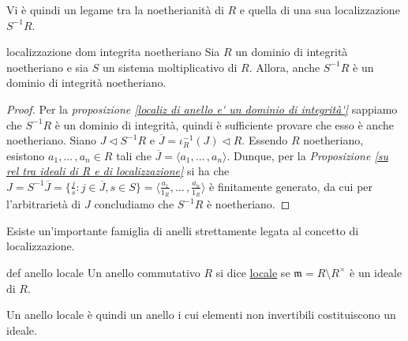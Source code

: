 \noindent Vi è quindi un legame tra la noetherianità di $R$ e quella di una sua localizzazione $S^{-1}R$.

\begin{cor}[1.7.7]{localizzazione dom integrita noetheriano}
  Sia $R$ un dominio di integrità noetheriano e sia $S$ un sistema moltiplicativo di $R$. Allora, anche $S^{-1}R$ è un dominio di integrità noetheriano.
\end{cor}
\vspace{-4mm}
\begin{proof}
  Per la \emph{proposizione \ref{localiz di anello e' un dominio di integrità'}} sappiamo che $S^{-1}R$ è un dominio di integrità, 
  quindi è sufficiente provare che esso è anche noetheriano. Siano $J\lhd S^{-1}R$ e $\overline{J}=\iota_R^{-1}(J)\lhd R$. 
  Essendo $R$ noetheriano, esistono $a_1,...\,,a_n\in R$ tali che $\overline{J}=\langle a_1,...\,,a_n \rangle$. 
  Dunque, per la \emph{Proposizione \ref{su rel tra ideali di R e di localizzazione}} si ha che 
  $J=S^{-1}\overline{J}=\{\frac{j}{s}: j\in\overline{J}, s\in S\}=\langle \frac{a_1}{1_R},...\,,\frac{a_n}{1_R} \rangle$ è finitamente generato, 
  da cui per l'arbitrarietà di $J$ concludiamo che $S^{-1}R$ è noetheriano.
\end{proof}

\noindent Esiste un'importante famiglia di anelli strettamente legata al concetto di localizzazione.

\begin{defn}{def anello locale}
  Un anello commutativo $R$ si dice \underline{locale} se $\mathfrak{m}=R\setminus R^{\times}$ è un ideale di $R$.
\end{defn}

\noindent Un anello locale è quindi un anello i cui elementi non invertibili costituiscono un ideale.

